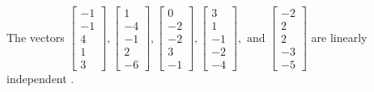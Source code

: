 \begin{exercise}
\begin{exerciseStatement}
  \end{exerciseStatement}
  \begin{exerciseAnswer}
   The vectors \(\left[\begin{array}{r}
-1 \\
-1 \\
4 \\
1 \\
3
\end{array}\right] , \left[\begin{array}{r}
1 \\
-4 \\
-1 \\
2 \\
-6
\end{array}\right] , \left[\begin{array}{r}
0 \\
-2 \\
-2 \\
3 \\
-1
\end{array}\right] , \left[\begin{array}{r}
3 \\
1 \\
-1 \\
-2 \\
-4
\end{array}\right] , \text{ and } \left[\begin{array}{r}
-2 \\
2 \\
2 \\
-3 \\
-5
\end{array}\right]\) are 
  	 linearly independent  .
  


  \end{exerciseAnswer}
\end{exercise}